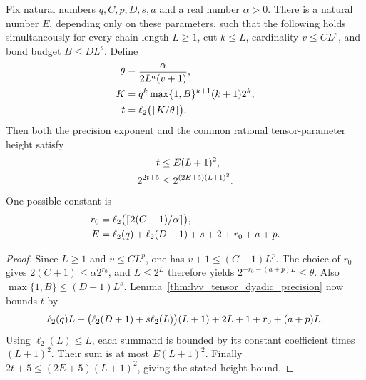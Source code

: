 \begin{lemma}
    \label{lem:lvv_uniform_tensor_precision}
    \leanok
    Fix natural numbers $q,C,p,D,s,a$ and a real number $\alpha>0$.
    There is a natural number $E$, depending only on these parameters,
    such that the following holds simultaneously for every chain length
    $L\ge1$, cut $k\le L$, cardinality $v\le CL^p$, and bond budget
    $B\le DL^s$. Define
    \begin{align}
        \theta & =\frac{\alpha}{2L^a(v+1)},\notag                \\
        K      & =q^k\max\{1,B\}^{k+1}(k+1)2^k,\notag            \\
        t      & =\ell_2\bigl(\lceil K/\theta\rceil\bigr).\notag
    \end{align}
    Then both the precision exponent and the common rational
    tensor-parameter height satisfy
    \begin{align}
        t        & \le E(L+1)^2,\notag         \\
        2^{2t+5} & \le2^{(2E+5)(L+1)^2}.\notag
    \end{align}
    One possible constant is
    \begin{align}
        r_0 & =\ell_2\bigl(\lceil2(C+1)/\alpha\rceil\bigr),\notag \\
        E   & =\ell_2(q)+\ell_2(D+1)+s+2+r_0+a+p.\notag
    \end{align}
\end{lemma}
\begin{proof}\leanok
    Since $L\ge1$ and $v\le CL^p$, one has
    $v+1\le(C+1)L^p$. The choice of $r_0$ gives
    $2(C+1)\le\alpha2^{r_0}$, and $L\le2^L$ therefore yields
    $2^{-r_0-(a+p)L}\le\theta$.
    Also $\max\{1,B\}\le(D+1)L^s$.
    Lemma~\ref{thm:lvv_tensor_dyadic_precision} now bounds $t$ by
    \begin{align}
        \ell_2(q)L+
        \bigl(\ell_2(D+1)+s\ell_2(L)\bigr)(L+1)
        +2L+1+r_0+(a+p)L.\notag
    \end{align}
    Using $\ell_2(L)\le L$, each summand is bounded by its constant
    coefficient times $(L+1)^2$. Their sum is at most $E(L+1)^2$.
    Finally $2t+5\le(2E+5)(L+1)^2$, giving the stated height bound.
\end{proof}

